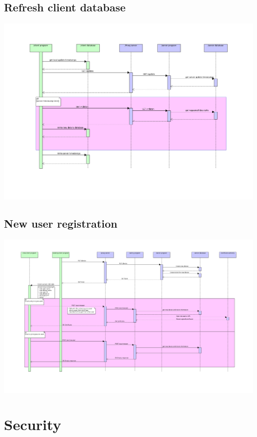 \documentclass[12pt]{report}
\begin{document}
\subsection{Refresh client database}

\includegraphics[width=\linewidth]{diagrams/Refreshment.png}

\subsection{New user registration}

\includegraphics[width=\linewidth]{diagrams/new-user-registration.png}

\section{Security}
\end{document}

